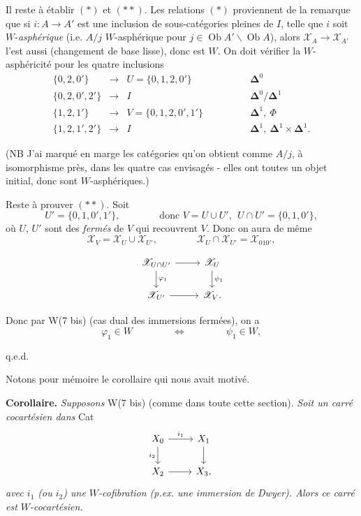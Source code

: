 \documentclass[11pt]{article}
\newcommand{\printedpage}[1]{\marginpar{\footnotesize p.~#1}}
\newcommand{\msp}[1]{\marginpar{\footnotesize [#1]}}
\newcommand{\cX}{\mathscr{X}}
\newcommand{\Ob}{\operatorname{Ob}}
\begin{document}
Il reste à établir $(\ast)$ et $(\ast\ast)$. Les relations $(\ast)$ proviennent de la remarque que si $i : A \longrightarrow A'$ est une inclusion de sous-catégories pleines de $I$, telle que $i$ soit $W$-\textit{asphérique} (i.e. $A/j$ $W$-asphérique pour $j \in \Ob A'\backslash\Ob A$), alors $\cX_A \longrightarrow \cX_{A'}$ l'est aussi (changement de base lisse), donc est $W$. On doit vérifier la $W$-asphéricité pour les quatre inclusions
\[
\begin{array}{rcll}
\{0,2,0'\} & \longrightarrow & U = \{0,1,2,0'\} & \qquad\qquad \mathbf{\Delta}^0 \\[1ex]
\{0,2,0',2'\} & \longrightarrow & I & \qquad\qquad \mathbf{\Delta}^0/\mathbf{\Delta}^1 \\[1ex]
\{1,2,1'\} & \longrightarrow & V = \{0,1,2,0',1'\} & \qquad\qquad \mathbf{\Delta}^1,\ \Phi \\[1ex]
\{1,2,1',2'\} & \longrightarrow & I & \qquad\qquad \mathbf{\Delta}^1,\ \mathbf{\Delta}^1 \times \mathbf{\Delta}^1.
\end{array}
\]

\printedpage{154}

(NB J'ai marqué en marge les catégories qu'on obtient comme $A/j$, à isomorphisme près, dans les quatre cas envisagés - elles ont toutes un objet initial, donc sont $W$-asphériques.)

Reste à prouver $(\ast\ast)$. Soit
\[
U' = \{0,1,0',1'\}, \qquad\qquad \text{donc } V = U \cup U',\ \ U \cap U' = \{0,1,0'\},
\]
où $U$, $U'$ sont des \textit{fermés} de $V$ qui recouvrent $V$. Donc on aura de même
\[
\cX_V = \cX_U \cup \cX_{U'}, \qquad\qquad \cX_U \cap \cX_{U'} = \cX_{010'},
\]

\msp{page 239}

\[
\begin{tikzcd}[ampersand replacement=\&]
\cX_{U\cap U'} \arrow[r] \arrow[d, "\varphi_1"] \& \cX_U \arrow[d, "\psi_1"] \\
\cX_{U'} \arrow[r] \& \cX_V.
\end{tikzcd}
\]

Donc par W(7 bis) (cas dual des immersions fermées), on a
\[
\varphi_1 \in W \qquad\qquad \Longleftrightarrow \qquad\qquad \psi_1 \in W,
\]

\hfill q.e.d.

Notons pour mémoire le corollaire qui nous avait motivé.

\textbf{Corollaire.} \textit{Supposons} W(7 bis) (comme dans toute cette section). \textit{Soit un carré cocartésien dans} Cat
\[
\begin{tikzcd}[ampersand replacement=\&]
X_0 \arrow[r, "i_1"] \arrow[d, "i_2"'] \& X_1 \arrow[d] \\
X_2 \arrow[r] \& X_3,
\end{tikzcd}
\]
\textit{avec $i_1$ (ou $i_2$) une $W$-cofibration (p.ex. une immersion de Dwyer). Alors ce carré est $W$-cocartésien.}
\end{document}
